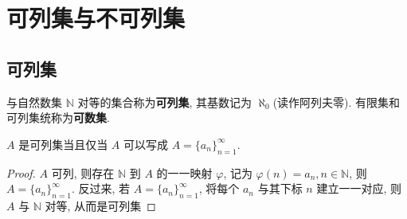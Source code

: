 \documentclass[../../main.tex]{subfiles}
\begin{document}
\section{可列集与不可列集}

\subsection{可列集}

\begin{definition}[可列集]
与自然数集 $\mathbb{N}$ 对等的集合称为\textbf{可列集}, 其基数记为 $\aleph_0$(读作阿列夫零). 有限集和可列集统称为\textbf{可数集}.
\end{definition}

\begin{proposition}\label{proposition:可列集的表示方式}
$A$ 是可列集当且仅当 $A$ 可以写成 $A = \{a_n\}_{n = 1}^{\infty}$.
\end{proposition}
\begin{proof}
$A$ 可列, 则存在 $\mathbb{N}$ 到 $A$ 的一一映射 $\varphi$, 记为 $\varphi(n) = a_n, n \in \mathbb{N}$, 则 $A = \{a_n\}_{n = 1}^{\infty}$. 反过来, 若 $A = \{a_n\}_{n = 1}^{\infty}$, 将每个 $a_n$ 与其下标 $n$ 建立一一对应, 则 $A$ 与 $\mathbb{N}$ 对等, 从而是可列集
\end{proof}
\end{document}

